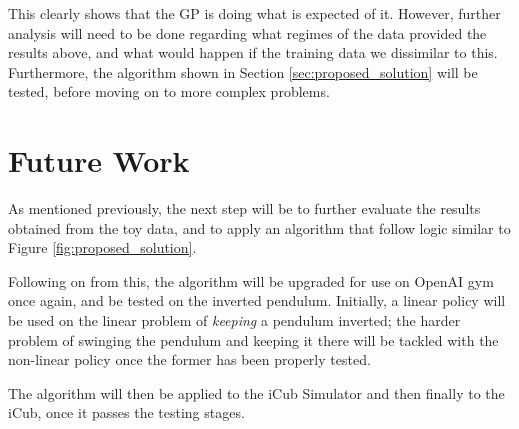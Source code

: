 This clearly shows that the GP is doing what is expected of it. However, further analysis will need to be done regarding what regimes of the data provided the results above, and what would happen if the training data we dissimilar to this. Furthermore, the algorithm shown in Section \ref{sec:proposed_solution} will be tested, before moving on to more complex problems.
%
\\
%
\section{Future Work} \label{sec:future_work}

As mentioned previously, the next step will be to further evaluate the results obtained from the toy data, and to apply an algorithm that follow logic similar to Figure \ref{fig:proposed_solution}. 

Following on from this, the algorithm will be upgraded for use on OpenAI gym once again, and be tested on the inverted pendulum. Initially, a linear policy will be used on the linear problem of \emph{keeping} a pendulum inverted; the harder problem of swinging the pendulum and keeping it there will be tackled with the non-linear policy once the former has been properly tested.

The algorithm will then be applied to the iCub Simulator and then finally to the iCub, once it passes the testing stages. 
